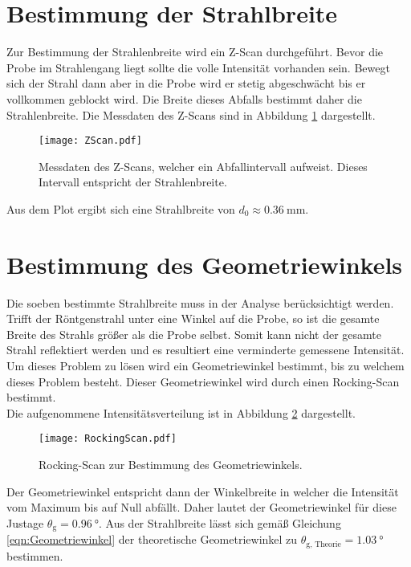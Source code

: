 \section{Bestimmung der Strahlbreite}
\label{sec:ZScan}
Zur Bestimmung der Strahlenbreite wird ein Z-Scan durchgeführt. Bevor die Probe im Strahlengang liegt sollte die volle Intensität vorhanden sein. Bewegt sich der Strahl dann aber in 
die Probe wird er stetig abgeschwächt bis er vollkommen geblockt wird. Die Breite dieses Abfalls bestimmt daher die Strahlenbreite. Die Messdaten des Z-Scans sind in Abbildung 
\ref{fig:ZScan} dargestellt.

\begin{figure}
    \centering
    \texttt{[image: ZScan.pdf]}
    \caption{Messdaten des Z-Scans, welcher ein Abfallintervall aufweist. Dieses Intervall entspricht der Strahlenbreite.}
    \label{fig:ZScan}
\end{figure}

Aus dem Plot ergibt sich eine Strahlbreite von $d_0 \approx \qty{0.36}{\milli\metre}$. 

\section{Bestimmung des Geometriewinkels}
\label{sec:Rocking}

Die soeben bestimmte Strahlbreite muss in der Analyse berücksichtigt werden. Trifft der Röntgenstrahl unter eine Winkel auf die Probe, so ist die gesamte Breite des Strahls größer als 
die Probe selbst. Somit kann nicht der gesamte Strahl reflektiert werden und es resultiert eine verminderte gemessene Intensität. Um dieses Problem zu lösen wird ein Geometriewinkel 
bestimmt, bis zu welchem dieses Problem besteht. Dieser Geometriewinkel wird durch einen Rocking-Scan bestimmt. \\
Die aufgenommene Intensitätsverteilung ist in Abbildung 
\ref{fig:RockingScan} dargestellt. 
\begin{figure}
    \centering
    \texttt{[image: RockingScan.pdf]}
    \caption{Rocking-Scan zur Bestimmung des Geometriewinkels.}
    \label{fig:RockingScan}
\end{figure}
Der Geometriewinkel entspricht dann der Winkelbreite in welcher die Intensität vom Maximum bis auf Null abfällt. Daher lautet der Geometriewinkel für diese Justage
$\theta_\text{g} = \qty{0.96}{\degree}$. Aus der Strahlbreite lässt sich gemäß Gleichung \ref{eqn:Geometriewinkel} der theoretische Geometriewinkel zu 
$\theta_\text{g, Theorie} = \qty{1.03}{\degree}$ bestimmen.

